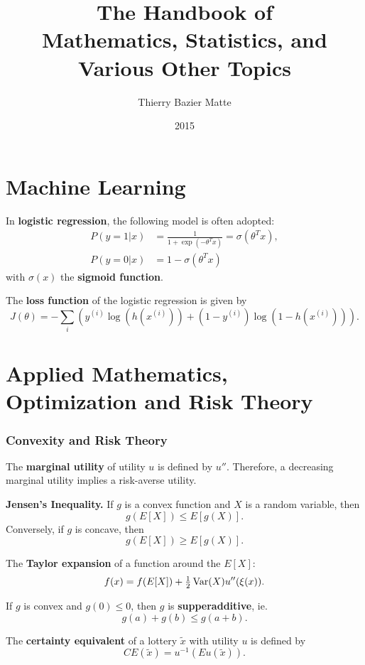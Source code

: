 \documentclass[10pt]{article}
\title{The Handbook of\\Mathematics, Statistics, and Various Other Topics}
\author{Thierry Bazier Matte}
\date{2015}
\begin{document}
\maketitle

\part{Machine Learning}
\begin{outline}
  \1 In \textbf{logistic regression}, the following model is often adopted:
  \begin{align*}
    P(y=1|x) &= \frac{1}{1+\exp(-\theta^Tx)} = \sigma(\theta^Tx),\\
    P(y=0|x) &= 1 - \sigma(\theta^Tx)
  \end{align*}
  with $\sigma(x)$ the \textbf{sigmoid function}.

  \1 The \textbf{loss function} of the logistic regression is given by 
  \begin{equation*}
    J(\theta) = -\sum_i (y^{(i)}\log(h(x^{(i)})) + (1-y^{(i)})\log(1-h(x^{(i)}))).
  \end{equation*}

\end{outline}

\part{Applied Mathematics, Optimization and Risk Theory}

\section{Convexity and Risk Theory}
\begin{outline}
\1 The \textbf{marginal utility} of utility $u$ is defined by $u''$. Therefore, a
decreasing marginal utility implies a risk-averse utility.

\1 \textbf{Jensen's Inequality.} If $g$ is a convex function and $X$ is a
random variable, then
\begin{equation*}
  g(E[X]) \leq E[g(X)].
\end{equation*}
Conversely, if $g$ is concave, then
\begin{equation*}
  g(E[X]) \geq E[g(X)].
\end{equation*}

\1 The \textbf{Taylor expansion} of a function around the $E[X]$:
\begin{equation*}
  f(x) = f(E[X]) + \tfrac{1}{2}\operatorname{Var}(X)u''(\xi(x)).
\end{equation*}

\1 If $g$ is convex and $g(0)\leq0$, then $g$ is \textbf{supperadditive}, ie.
\begin{equation*}
  g(a) + g(b) \leq g(a+b).
\end{equation*}

\1 The \textbf{certainty equivalent} of a lottery $\tilde x$ with utility $u$ is defined by
\begin{equation*}
  CE(\tilde x) = u^{-1}(Eu(\tilde x)).
\end{equation*}

\end{outline}
\end{document}
